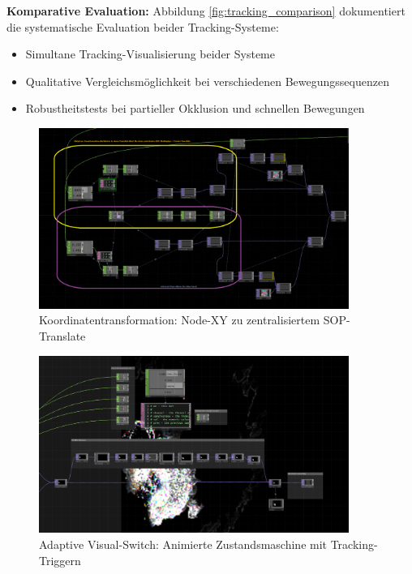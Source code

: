\textbf{Komparative Evaluation:}
Abbildung \ref{fig:tracking_comparison} dokumentiert die systematische Evaluation beider Tracking-Systeme:
\begin{itemize}
    \item Simultane Tracking-Visualisierung beider Systeme
    \item Qualitative Vergleichsmöglichkeit bei verschiedenen Bewegungssequenzen
    \item Robustheitstests bei partieller Okklusion und schnellen Bewegungen
\end{itemize}

\begin{figure}[H]
    \centering
    \includegraphics[width=0.9\textwidth]{images/docupictures/NodeXYzuSOPZentriertemTranslate.png}
    \caption{Koordinatentransformation: Node-XY zu zentralisiertem SOP-Translate}
    \label{fig:coordinate_transformation}
\end{figure}

\begin{figure}[H]
    \centering
    \includegraphics[width=0.9\textwidth]{images/docupictures/NoisyBlob_animatedSwitchzwischenBlitzUndNichtBlitzBeiTrackingTrigger.png}
    \caption{Adaptive Visual-Switch: Animierte Zustandsmaschine mit Tracking-Triggern}
    \label{fig:animated_switch}
\end{figure}

